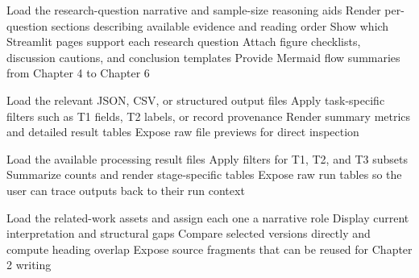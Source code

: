 \begin{algorithm}[H]
Load the research-question narrative and sample-size reasoning aids\;
Render per-question sections describing available evidence and reading order\;
Show which Streamlit pages support each research question\;
Attach figure checklists, discussion cautions, and conclusion templates\;
Provide Mermaid flow summaries from Chapter 4 to Chapter 6\;
\caption{Research Questions Dashboard}
\label{alg:research-questions-dashboard}
\end{algorithm}

\begin{algorithm}[H]
Load the relevant JSON, CSV, or structured output files\;
Apply task-specific filters such as T1 fields, T2 labels, or record provenance\;
Render summary metrics and detailed result tables\;
Expose raw file previews for direct inspection\;
\caption{Ground Truth Output and Pipeline Visualizer Suite}
\label{alg:ground-truth-output-suite}
\end{algorithm}

\begin{algorithm}[H]
Load the available processing result files\;
Apply filters for T1, T2, and T3 subsets\;
Summarize counts and render stage-specific tables\;
Expose raw run tables so the user can trace outputs back to their run context\;
\caption{LLM Processing Result Visualizer}
\label{alg:llm-result-visualizer}
\end{algorithm}

\begin{algorithm}[H]
Load the related-work assets and assign each one a narrative role\;
Display current interpretation and structural gaps\;
Compare selected versions directly and compute heading overlap\;
Expose source fragments that can be reused for Chapter 2 writing\;
\caption{Related Work Documentation and Comparison}
\label{alg:related-work-doc-comparison}
\end{algorithm}

